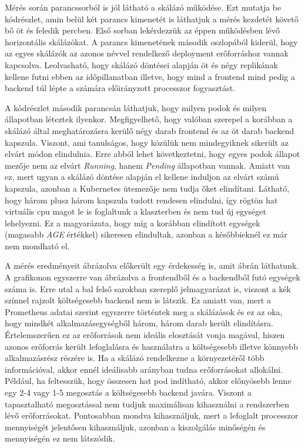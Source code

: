 Mérés során parancssorból is jól látható a skálázó működése. 
Ezt mutatja be  kódrészlet, amin belül két parancs kimenetét is láthatjuk a mérés kezdetét követő bő öt és feledik percben.
Első sorban lekérdezzük az éppen működésben lévő horizontális skálázókat. 
A parancs kimenetének második oszlopából kiderül, hogy az egyes skálázók az azonos névvel rendelkező deployment erőforráshoz vannak kapcsolva.
Leolvasható, hogy skálázó döntései alapján öt és négy replikának kellene futni ebben az időpillanatban illetve, hogy mind a frontend mind pedig a backend túl lépte a számára előirányzott processzor fogyasztást.

A kódrészlet második parancsán láthatjuk, hogy milyen podok és milyen állapotban léteztek ilyenkor.
Megfigyelhető, hogy valóban szerepel a korábban a skálázó által meghatározásra kerülő négy darab frontend és az öt darab backend kapszula.
Viszont, ami tanulságos, hogy közülük nem mindegyiknek sikerült az elvárt módon elindulnia.
Erre abból lehet következtetni, hogy egyes podok állapot mezője nem az elvárt \textit{Running}, hanem \textit{Pending} állapotban vannak.
Amiatt van ez, mert ugyan a skálázó döntése alapján el kellene induljon az elvárt számú kapszula, azonban a Kubernetes ütemezője nem tudja őket elindítani.
Látható, hogy három plusz három kapszula tudott rendesen elindulni, így rögtön hat virtuális cpu magot le is foglaltunk a klaszterben és nem tud új egységet lehelyezni.
Ez a magyarázata, hogy míg a korábban elindított egységek (magasabb \textit{AGE} értékkel) sikeresen elindultak, azonban a későbbieknél ez már nem mondható el.

\lstset{caption=Horizontális skálázóval történő mérés, label=hpa_measurement_pending}


A mérés eredményeit ábrázolva előkerült egy érdekesség is, amit  ábrán láthatunk.
A grafikonon egyszerre van ábrázolva a frontendből és a backendből futó egységek száma is.
Erre utal a bal felső sarokban szereplő jelmagyarázat is, viszont a kék színnel rajzolt költségesebb backend nem is látszik.
Ez amiatt van, mert a Prometheus adatai szerint egyszerre történtek meg a skálázások és ez az oka, hogy mindkét alkalmazásegységből három, három darab került elindításra.
Értelemszerűen ez az erőforrások nem ideális elosztását vonja magával, hiszen azonos erőforrás került lefoglalásra és használatra a költségesebb illetve könnyebb alkalmazásrész részére is.
Ha a skálázó rendelkezne a környezetéről több információval, akkor ennél ideálisabb arányban tudna erőforrásokat allokálni.
Például, ha feltesszük, hogy összesen hat pod indítható, akkor előnyösebb lenne egy 2-4 vagy 1-5 megosztás a költségesebb backend javára.
Viszont a tapasztalható megosztással nem tudjuk maximálisan kihasználni a rendszerben lévő erőforrásokat.
Pontosabban mondva kihasználjuk, mert a lefoglalt processzor mennyiségét jelentősen kihasználjuk, azonban a kiszolgálás minőségén és mennyiségén ez nem látszódik.

